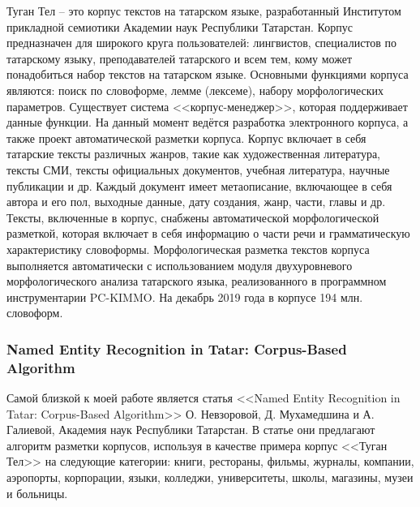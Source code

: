 Туган Тел -- это корпус текстов на татарском языке, разработанный Институтом прикладной
семиотики Академии наук Республики Татарстан. Корпус предназначен для широкого круга 
пользователей: лингвистов, специалистов по татарскому языку, преподавателей татарского и всем 
тем, кому может понадобиться набор текстов на татарском языке. Основными функциями корпуса 
являются: поиск  по словоформе, лемме (лексеме), набору морфологических параметров. 
Существует система <<корпус-менеджер>>, которая поддерживает данные функции.  На данный 
момент ведётся разработка электронного корпуса, а также проект
автоматической разметки корпуса. Корпус включает в  себя татарские тексты различных жанров, такие как художественная литература, тексты СМИ, тексты официальных документов, учебная литература, научные публикации и др. Каждый документ имеет метаописание, включающее в себя автора и его пол, выходные данные, дату  создания, жанр, части, главы и др. Тексты, включенные в корпус, снабжены автоматической  морфологической разметкой, которая включает в себя информацию о части речи и 
грамматическую характеристику словоформы. Морфологическая разметка текстов корпуса 
выполняется автоматически с использованием модуля двухуровневого морфологического анализа 
татарского языка, реализованного в программном инструментарии PC-KIMMO. На 
декабрь 2019 года в корпусе 194 млн. словоформ. 

\subsubsection{Named Entity Recognition in Tatar: Corpus-Based Algorithm}

Самой близкой к моей работе является статья <<Named Entity Recognition in Tatar:
Corpus-Based Algorithm>> О. Невзоровой, Д. Мухамедшина и А. Галиевой, Академия наук Республики Татарстан. В статье они предлагают алгоритм разметки корпусов, используя в качестве примера корпус <<Туган Тел>> \cite{tugan_tel} на следующие категории: книги, рестораны, фильмы, журналы, компании, аэропорты, корпорации, языки, колледжи, университеты, школы, магазины, музеи и больницы. 

